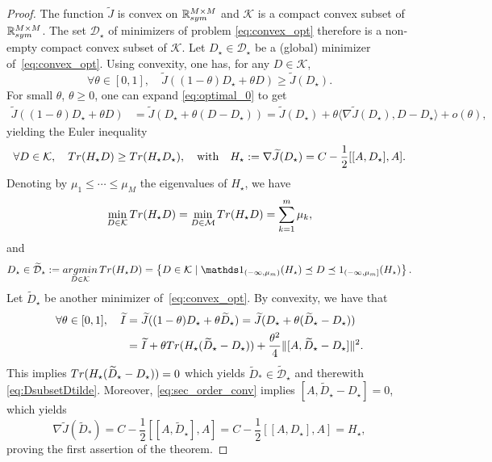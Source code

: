 \documentclass[10pt,a4paper]{amsart}
\def\R{\mathbb R}
\newcommand{\tr}{{\rm Tr}}
\begin{document}
\begin{proof}
    The function $\widetilde J$ is convex on $\R^{M \times M}_{\rm sym}$ and $\mathcal K$ is a compact convex subset of $\R^{M \times M}_{\rm sym}$. The set $\mathcal{D}_\star$  of minimizers of problem \eqref{eq:convex_opt} therefore is a non-empty compact convex subset of $\mathcal{K}$. Let $D_\star \in \mathcal{D}_\star$ be a (global) minimizer of~\eqref{eq:convex_opt}. Using convexity, one has, for any $D \in \mathcal{K}$,
\begin{equation}\label{eq:optimal_0}
\forall \theta \in [0,1], \quad \widetilde J((1-\theta) D_\star + \theta D) \geq \widetilde J(D_\star). \end{equation}
For small $\theta$, $\theta \geq 0$, one can expand \eqref{eq:optimal_0} to get
\begin{align*}
    \widetilde J((1-\theta) D_\star + \theta D)& = \widetilde J( D_\star + \theta (D-D_\star))= \widetilde J( D_\star) + \theta \langle\nabla \widetilde J( D_\star) , D-D_\star\rangle + o(\theta),
\end{align*}
yielding the Euler inequality
\begin{equation}\label{eq:euler_lagrange}
\forall D \in \mathcal{K}, \quad \tr(H_\star D) \ge  \tr( H_\star D_\star), \quad \mbox{with} \quad H_\star := \nabla \widetilde J( D_\star)=C- \frac 12[[A,D_\star],A].
\end{equation}
Denoting by  $\mu_1 \le \cdots \le \mu_M$ the eigenvalues of $H_\star$, we have 
$$
    \min_{D \in \mathcal{K} }\tr(H_\star D) = \min_{D \in \mathcal{M}}\tr(H_\star D) = \sum_{k = 1}^{m} \mu_{k},
$$
and
$$
D_\star \in \widetilde {\mathcal D}_\star:= \mathop{\rm argmin}_{D \in \mathcal K}\tr(H_\star D)=\left\{ D \in \mathcal K \; | \;  \mathds 1_{(-\infty,\mu_m)}(H_\star) \preceq D \preceq 1_{(-\infty,\mu_m]}(H_\star) \right\}.
$$
Let $\widetilde D_\star$ be another minimizer of~\eqref{eq:convex_opt}. By convexity, we have that
\begin{align}
\forall \theta \in [0,1], \quad \widetilde I &= \widetilde J((1-\theta) D_\star + \theta \widetilde D_\star)  = \widetilde J(D_\star +\theta(\widetilde D_\star- D_\star)) \nonumber \\
&= \widetilde I + \theta \tr(H_\star ( \widetilde D_\star-D_\star)) +\frac{\theta^2}4 \lVert [A,\widetilde D_{\star} - D_\star] \rVert^2. \label{eq:sec_order_conv}
\end{align}
This implies $\tr(H_\star ( \widetilde D_\star-D_\star))=0$ which yields $\widetilde D_* \in \widetilde {\mathcal D}_\star$ and therewith \eqref{eq:DsubsetDtilde}. Moreover, \eqref{eq:sec_order_conv} implies $[A,\widetilde D_{\star} - D_\star]=0$, which yields
$$
\nabla \widetilde J(\widetilde D_*) = C-  \frac 12[[A,\widetilde D_\star],A] =  C-  \frac 12[[A,D_\star],A] = H_\star,
$$
proving the first assertion of the theorem.


\end{proof}
\end{document}
